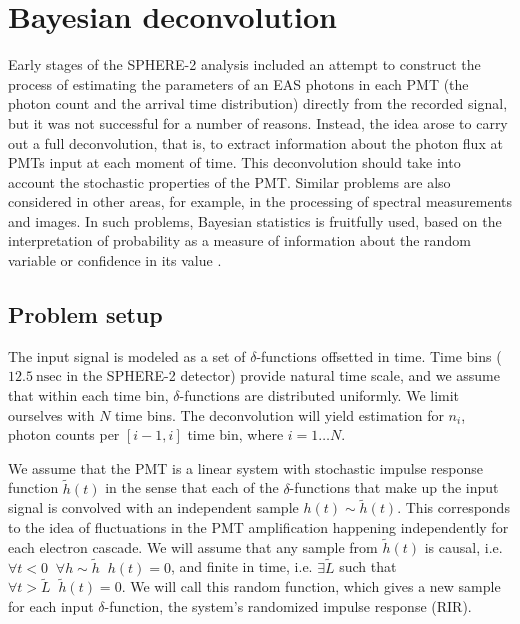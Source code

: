 \chapter{Bayesian deconvolution}
\label{chapt:bayesian-deconvolution}

Early stages of the SPHERE-2 analysis included an attempt to construct the process of estimating the parameters of an EAS photons in each PMT (the photon count and the arrival time distribution) directly from the recorded signal, but it was not successful for a number of reasons. Instead, the idea arose to carry out a full deconvolution, that is, to extract information about the photon flux at PMTs input at each moment of time. This deconvolution should take into account the stochastic properties of the PMT. Similar problems are also considered in other areas, for example, in the processing of \cite{Rhode1993} spectral measurements and \cite{Wipf2013} images. In such problems, Bayesian statistics is fruitfully used, based on the interpretation of probability as a measure of information about the random variable or confidence in its value \cite{Gelman2013}.

\section{Problem setup}

The input signal is modeled as a set of $\delta$-functions offsetted in time. Time bins ($12.5~\mathrm{nsec}$ in the SPHERE-2 detector) provide natural time scale, and we assume that within each time bin, $\delta$-functions are distributed uniformly. We limit ourselves with $N$ time bins. The deconvolution will yield estimation for $n_i$, photon counts per $[i-1, i]$ time bin, where $i = 1 \ldots N$.

We assume that the PMT is a linear system with stochastic impulse response function $\tilde{h}(t)$ in the sense that each of the $\delta$-functions that make up the input signal is convolved with an independent sample $h(t) \sim\tilde{h}(t)$. This corresponds to the idea of fluctuations in the PMT amplification happening independently for each electron cascade. We will assume that any sample from $\tilde{h}(t)$ is causal, i.e. $\forall t < 0 \; \; \forall h \sim \tilde{h} \; \; h(t) = 0$, and finite in time, i.e. $\exists \tilde{L}$ such that $\forall t > \tilde{L} \; \; \tilde{h}(t) = 0$. We will call this random function, which gives a new sample for each input $\delta$-function, the system's randomized impulse response (RIR).

